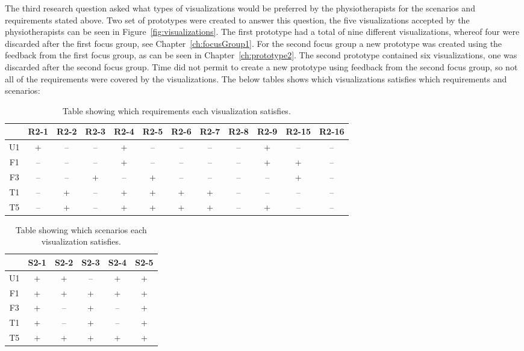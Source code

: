The third research question asked what types of visualizations would be preferred by the physiotherapists for the scenarios and requirements stated above. Two set of prototypes were created to answer this question, the five visualizations accepted by the physiotherapists can be seen in Figure~\ref{fig:visualizations}. The first prototype had a total of nine different visualizations, whereof four were discarded after the first focus group, see Chapter~\ref{ch:focusGroup1}. For the second focus group a new prototype was created using the feedback from the first focus group, as can be seen in Chapter~\ref{ch:prototype2}. The second prototype contained six visualizations, one was discarded after the second focus group. Time did not permit to create a new prototype using feedback from the second focus group, so not all of the requirements were covered by the visualizations. The below tables shows which visualizations satisfies which requirements and scenarios:

\begin{table}[h!]
  \centering
  \begin{tabular}{|c|c|c|c|c|c|c|c|c|c|c|c|}
    \hline
    & R2-1 & R2-2 & R2-3 & R2-4 & R2-5 & R2-6 & R2-7 & R2-8 & R2-9 & R2-15 & R2-16 \\ \hline
    U1 & + & -- & -- & + & -- & -- & -- & -- & + & -- & -- \\ \hline
    F1 & -- & -- & -- & + & -- & -- & -- & -- & + & + & -- \\ \hline
    F3 & -- & -- & + & -- & + & -- & -- & -- & -- & + & -- \\ \hline
    T1 & -- & + & -- & + & + & + & + & -- & -- & -- & -- \\ \hline
    T5 & -- & + & -- & + & + & + & + & -- & + & -- & -- \\ \hline
  \end{tabular}
  \caption{Table showing which requirements each visualization satisfies.}
\end{table} 

\begin{table}[h!]
  \centering
  \begin{tabular}{|c|c|c|c|c|c|}
    \hline
       & S2-1 & S2-2 & S2-3 & S2-4 & S2-5 \\ \hline
    U1 & +  & +  & -- & +  & +  \\ \hline
    F1 & +  & +  & +  & +  & +  \\ \hline
    F3 & +  & -- & +  & -- & +  \\ \hline
    T1 & +  & -- & +  & -- & +  \\ \hline
    T5 & +  & +  & +  & +  & +  \\ \hline
  \end{tabular}
  \caption{Table showing which scenarios each visualization satisfies.}
\end{table}

